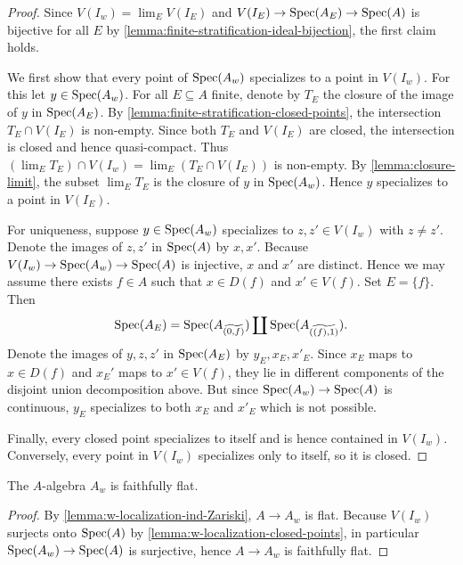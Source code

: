 \begin{proof}
    Since $V(I_w) = \lim_{E} V(I_E)$ and $V(I_E) \to \mathrm{Spec}(A_E) \to \mathrm{Spec}(A)$ is
    bijective for all $E$ by \ref{lemma:finite-stratification-ideal-bijection}, the
    first claim holds.

    We first show that every point of $\mathrm{Spec}(A_w)$ specializes to a point in $V(I_w)$.
    For this let $y \in \mathrm{Spec}(A_w)$. For all $E \subseteq A$ finite, denote by
    $T_E$ the closure of the image of $y$ in $\mathrm{Spec}(A_E)$. By
    \ref{lemma:finite-stratification-closed-points}, the intersection $T_E \cap V(I_E)$ is
    non-empty. Since both $T_E$ and $V(I_E)$ are closed, the intersection is closed
    and hence quasi-compact. Thus $(\lim_E T_E) \cap V(I_w) = \lim_E (T_E \cap V(I_E))$ is non-empty.
    By \ref{lemma:closure-limit}, the subset $\lim_E T_E$ is the closure of $y$ in $\mathrm{Spec}(A_w)$. Hence
    $y$ specializes to a point in $V(I_E)$.

    For uniqueness, suppose $y \in \mathrm{Spec}(A_w)$ specializes to $z, z' \in V(I_w)$ with
    $z \neq z'$. Denote the images of $z, z'$ in $\mathrm{Spec}(A)$ by $x, x'$.
    Because $V(I_w) \to \mathrm{Spec}(A_w) \to \mathrm{Spec}(A)$ is injective, $x$ and $x'$ are distinct. Hence we may
    assume there exists $f \in A$ such that $x \in D(f)$ and $x' \in V(f)$. Set
    $E = \{f\}$. Then
    \[
        \mathrm{Spec}(A_E) = \mathrm{Spec}(A_{\widetilde{(0, f)}}) \coprod \mathrm{Spec}(A_{\widetilde{((f), 1)}})
    .\]
    Denote the images of $y, z, z'$ in $\mathrm{Spec}(A_E)$ by $y_E, x_E, x'_E$. Since
    $x_E$ maps to $x \in D(f)$ and $x_E'$ maps to $x' \in V(f)$, they lie
    in different components of the disjoint union decomposition above. But
    since $\mathrm{Spec}(A_w) \to \mathrm{Spec}(A)$ is continuous, $y_E$ specializes to both $x_E$ and $x'_E$
    which is not possible.

    Finally, every closed point specializes to itself and is hence contained in $V(I_{w})$. Conversely,
    every point in $V(I_{w})$ specializes only to itself, so it is closed.
\end{proof}

\begin{lemma}
    The $A$-algebra $A_w$ is faithfully flat.
    \label{lemma:w-localization-faithfully-flat}
\end{lemma}

\begin{proof}
    By \ref{lemma:w-localization-ind-Zariski}, $A \to A_w$ is flat. Because
    $V(I_w)$ surjects onto $\mathrm{Spec}(A)$ by \ref{lemma:w-localization-closed-points},
    in particular $\mathrm{Spec}(A_w) \to \mathrm{Spec}(A)$ is surjective, hence
    $A \to A_w$ is faithfully flat.
\end{proof}

